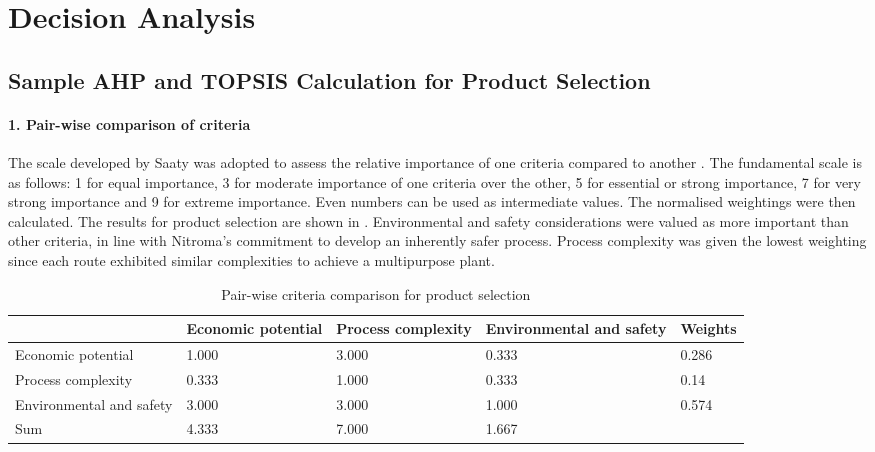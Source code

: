 \section{Decision Analysis}
\label{app:matrix}

\subsection{Sample AHP and TOPSIS Calculation for Product Selection}

\paragraph{1. Pair-wise comparison of criteria}
The scale developed by Saaty was adopted to assess the relative importance of one criteria compared to another \cite{saaty_analytic_1987}. The fundamental scale is as follows: 1 for equal importance, 3 for moderate importance of one criteria over the other, 5 for essential or strong importance, 7 for very strong importance and 9 for extreme importance. Even numbers can be used as intermediate values. The normalised weightings were then calculated. The results for product selection are shown in . Environmental and safety considerations were valued as more important than other criteria, in line with Nitroma's commitment to develop an inherently safer process. Process complexity was given the lowest weighting since each route exhibited similar complexities to achieve a multipurpose plant.  

\begin{table}[H]
\centering
\caption{Pair-wise criteria comparison for product selection}
\label{tab:pairwise}
\begin{tabularx}{\linewidth}{l|XXX|l}
\toprule
                                                                & Economic potential & Process complexity & Environmental and safety & Weights \\ \midrule
Economic potential                        & 1.000              & 3.000              & 0.333                    & 0.286   \\
Process complexity                      & 0.333              & 1.000              & 0.333                    & 0.14    \\
Environmental and   safety & 3.000              & 3.000              & 1.000                    & 0.574   \\ \midrule
Sum                                      & 4.333              & 7.000              & 1.667                    &                              \\ \bottomrule
\end{tabularx}
\end{table}


